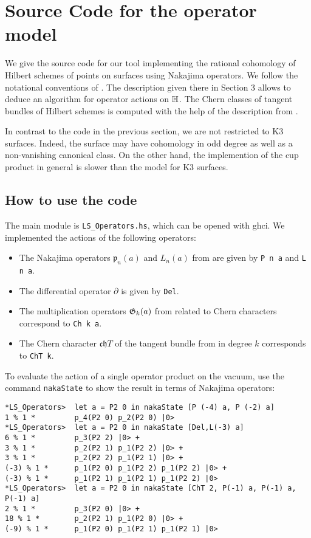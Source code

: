 
\section{Source Code for the operator model}\label{VertexCode}
We give the source code for our tool implementing the rational cohomology of Hilbert schemes of points on surfaces using Nakajima operators. 
We follow the notational conventions of \cite{LehnSorger}. The description given there in Section 3 allows to deduce an algorithm for operator actions on $\mathbb{H}$. The Chern classes of  tangent bundles of Hilbert schemes is computed with the help of the description from \cite[Section 3]{Boissiere}.

In contrast to the code in the previous section, we are not restricted to K3 surfaces. Indeed, the surface may have cohomology in odd degree as well as a non-vanishing canonical class. On the other hand, the implemention of the cup product in general is slower than the model for K3 surfaces. 

\subsection{How to use the code}
The main module is \verb|LS_Operators.hs|, which can be opened with ghci.
We implemented the actions of the following operators:
\begin{itemize}
 \item The Nakajima operators $\mathfrak p_n(a)$ and $L_n(a)$ from \cite{LehnSorger} are given by \verb|P n a| and \verb|L n a|. 
 \item The differential operator $\partial$ is given by \verb|Del|.
 \item The multiplication operators $\mathfrak{G}_k(a)$ from \cite{LiQinWang} related to Chern characters correspond to \verb|Ch k a|.
 \item The Chern character $\mathfrak{ch}T$ of the tangent bundle from \cite{Boissiere} in degree $k$ corresponds to \verb|ChT k|.
\end{itemize}
\begin{example}
To evaluate the action of a single operator product on the vacuum, use the command \verb|nakaState| to show the result in terms of Nakajima operators:
\begin{verbatim}
*LS_Operators>  let a = P2 0 in nakaState [P (-4) a, P (-2) a]
1 % 1 *         p_4(P2 0) p_2(P2 0) |0>
*LS_Operators>  let a = P2 0 in nakaState [Del,L(-3) a]
6 % 1 *         p_3(P2 2) |0> +
3 % 1 *         p_2(P2 1) p_1(P2 2) |0> +
3 % 1 *         p_2(P2 2) p_1(P2 1) |0> +
(-3) % 1 *      p_1(P2 0) p_1(P2 2) p_1(P2 2) |0> +
(-3) % 1 *      p_1(P2 1) p_1(P2 1) p_1(P2 2) |0>
*LS_Operators>  let a = P2 0 in nakaState [ChT 2, P(-1) a, P(-1) a, P(-1) a]
2 % 1 *         p_3(P2 0) |0> +
18 % 1 *        p_2(P2 1) p_1(P2 0) |0> +
(-9) % 1 *      p_1(P2 0) p_1(P2 1) p_1(P2 1) |0>
\end{verbatim}
\end{example}

